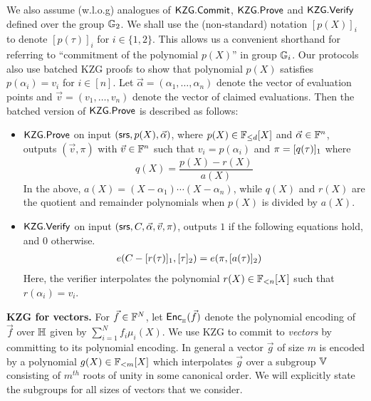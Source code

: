 We also assume (w.l.o.g) analogues of $\mathsf{KZG.Commit}$, $\mathsf{KZG.Prove}$ and $\mathsf{KZG.Verify}$ defined over the group $\mathbb{G}_2$.
We shall use the (non-standard) notation $[p(X)]_i$ to denote $[p(\tau)]_i$ for $i\in \{1,2\}$.
This allows us a convenient shorthand for referring to ``commitment of the polynomial $p(X)$'' in group $\mathbb{G}_i$.
Our protocols also use batched KZG proofs to show that polynomial $p(X)$ satisfies $p(\alpha_i)=v_i$ for $i\in [n]$. Let
$\vec{\alpha}=(\alpha_1,\ldots,\alpha_n)$
denote the vector of evaluation points and $\vec{v}=(v_1,\ldots,v_n)$ denote the vector of claimed evaluations. Then the batched
version of $\mathsf{KZG.Prove}$ is described as follows:
\begin{itemize}[leftmargin=1em]
	\item $\mathsf{KZG.Prove}$ on input $(\mathsf{srs},p(X),\vec{\alpha})$, where $p(X) \in \mathbb{F}_{\leq d}[X]$ and $\vec{\alpha}\in\mathbb{F}^n$,
	outputs $(\vec{v}, \pi)$ with $\vec{v}\in \mathbb{F}^n$ such that $v_i=p(\alpha_i)$ and $\pi=[q(\tau)]_1$ where
	\[ q(X)=\frac{p(X)-r(X)}{a(X)} \]
	In the above, $a(X)=(X-\alpha_1)\cdots(X-\alpha_n)$, while $q(X)$ and $r(X)$ are the quotient and remainder polynomials when
	 $p(X)$ is divided by $a(X)$.
	\item $\mathsf{KZG.Verify}$ on input $(\mathsf{srs},C,\vec{\alpha},\vec{v},\pi)$, outputs $1$ if the following equations hold, and $0$ otherwise.
	\begin{align*}
		e(C-[r(\tau)]_1, [\tau]_2) &= e(\pi, [a(\tau)]_2)
	\end{align*}
	Here, the verifier interpolates the polynomial $r(X)\in \mathbb{F}_{<n}[X]$ such that $r(\alpha_i)=v_i$.
\end{itemize}

\noindent\textbf{KZG for vectors.} For $\vec{f}\in \mathbb{F}^N$, let $\mathsf{Enc}_{{}_{\mathbb{H}}}(\vec{f})$ denote the polynomial encoding of $\vec{f}$ over $\mathbb{H}$ given by $\sum_{i=1}^N f_i\mu_i(X)$.
We use KZG to commit to \emph{vectors} by committing to its polynomial encoding. In general a vector $\vec{g}$ of size $m$ is encoded by a polynomial $g(X)\in \mathbb{F}_{<m}[X]$
which interpolates $\vec{g}$ over a subgroup $\mathbb{V}$ consisting of $m^{th}$ roots of unity in some canonical order. We will explicitly state the subgroups for all sizes
of vectors that we consider.

